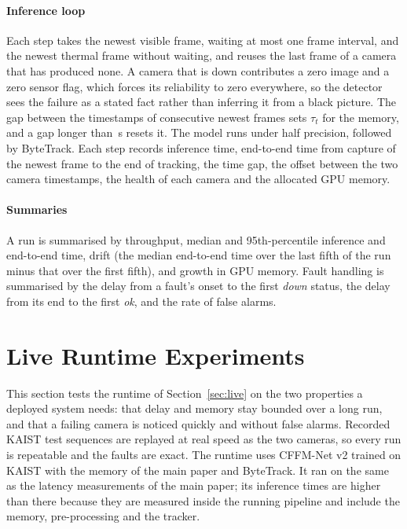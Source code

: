 \paragraph{Inference loop}
Each step takes the newest visible frame, waiting at most one frame interval, and the newest thermal frame without waiting, and reuses the last frame of a camera that has produced none. A camera that is down contributes a zero image and a zero sensor flag, which forces its reliability to zero everywhere, so the detector sees the failure as a stated fact rather than inferring it from a black picture. The gap between the timestamps of consecutive newest frames sets $\tau_t$ for the memory, and a gap longer than \cfgResetS{}\,s resets it. The model runs under half precision, followed by ByteTrack. Each step records inference time, end-to-end time from capture of the newest frame to the end of tracking, the time gap, the offset between the two camera timestamps, the health of each camera and the allocated GPU memory.

\paragraph{Summaries}
A run is summarised by throughput, median and 95th-percentile inference and end-to-end time, drift (the median end-to-end time over the last fifth of the run minus that over the first fifth), and growth in GPU memory. Fault handling is summarised by the delay from a fault's onset to the first \emph{down} status, the delay from its end to the first \emph{ok}, and the rate of false alarms.

\section{Live Runtime Experiments}
\label{sec:livexp}
This section tests the runtime of Section~\ref{sec:live} on the two properties a deployed system needs: that delay and memory stay bounded over a long run, and that a failing camera is noticed quickly and without false alarms. Recorded KAIST test sequences are replayed at real speed as the two cameras, so every run is repeatable and the faults are exact. The runtime uses CFFM-Net v2 trained on KAIST with the memory of the main paper and ByteTrack. It ran on the same \latLocalDevice{} as the latency measurements of the main paper; its inference times are higher than there because they are measured inside the running pipeline and include the memory, pre-processing and the tracker.

